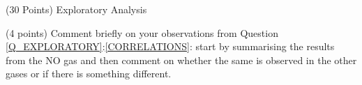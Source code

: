 \documentclass[12pt]{article}
\begin{document}
\begin{question}{\label{Q_EXPLORATORY}(30 Points) Exploratory Analysis}
\begin{subquestion}



\end{subquestion}

\begin{subquestion}{(4 points) Comment briefly on your observations from Question \ref{Q_EXPLORATORY}:\ref{CORRELATIONS}: start by summarising the results from the NO gas and then comment on whether the same is observed in the other gases or if there is something different.}






\end{subquestion}

\end{question}
\end{document}
